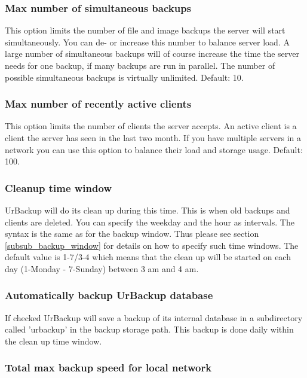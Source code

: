 \documentclass[a4paper,10pt]{article}
\begin{document}
\subsubsection{Max number of simultaneous backups}

This option limits the number of file and image backups the server will start
simultaneously. You can de- or increase this number to balance server load. A
large number of simultaneous backups will of course increase the time the server
needs for one backup, if many backups are run in parallel. The number of
possible simultaneous backups is virtually unlimited. Default: 10.

\subsubsection{Max number of recently active clients}

This option limits the number of clients the server accepts. An active client is
a client the server has seen in the last two month. If you have multiple servers
in a network you can use this option to balance their load and storage usage.
Default: 100.

\subsubsection{Cleanup time window}

UrBackup will do its clean up during this time. This is when old backups and
clients are deleted. You can specify the weekday and the hour as intervals. The
syntax is the same as for the backup window. Thus please see section
\ref{subsub_backup_window} for details on how to specify such time windows.
The default value is 1-7/3-4 which means that the clean up will be started on
each day (1-Monday - 7-Sunday) between 3 am and 4 am.

\subsubsection{Automatically backup UrBackup database}

If checked UrBackup will save a backup of its internal database in a
subdirectory called 'urbackup' in the backup storage path. This backup is done
daily within the clean up time window.

\subsubsection{Total max backup speed for local network}
\end{document}

